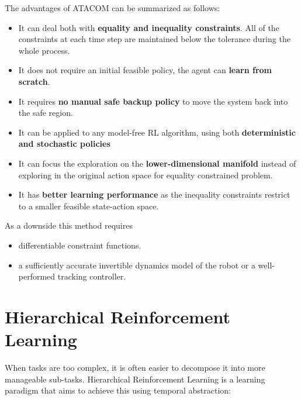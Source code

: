 The advantages of ATACOM can be summarized as follows:
\begin{itemize}
    \item It can deal both with \textbf{equality and inequality constraints}. All of the constraints at each time step are maintained
    below the tolerance during the whole process.
    \item It does not require an initial feasible policy, the agent can \textbf{learn from scratch}.
    \item It requires \textbf{no manual safe backup policy} to move the system back into the safe region.
    \item It can be applied to any model-free RL algorithm, using both \textbf{deterministic and stochastic policies}
    \item It can focus the exploration on the \textbf{lower-dimensional manifold} instead of exploring in the original action space
    for equality constrained problem.
    \item It has \textbf{better learning performance} as the inequality constraints restrict to a smaller feasible state-action space.
\end {itemize}

As a downside this method requires
\begin{itemize}
    \item differentiable constraint functions.
    \item a sufficiently accurate invertible dynamics model of the robot or a well-performed tracking controller.
\end{itemize}



\section{Hierarchical Reinforcement Learning}
When tasks are too complex, it is often easier to decompose it into more manageable sub-tasks. Hierarchical Reinforcement Learning
is a learning paradigm that aims to achieve this using temporal abstraction:

